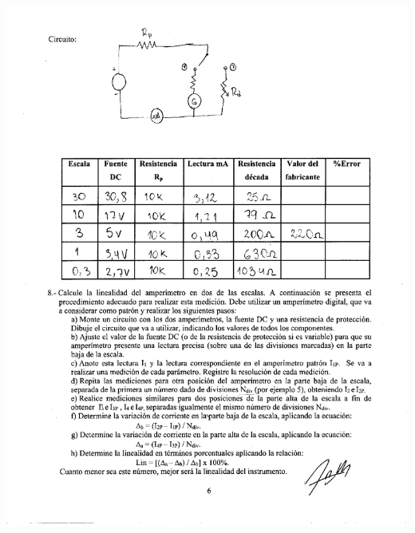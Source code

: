 \documentclass[12pt]{article}
\begin{document}
	\begin{center}
		\includegraphics[width=16cm,height=20cm]{Img/datos_lab_0003}
	\end{center}
\end{document}
